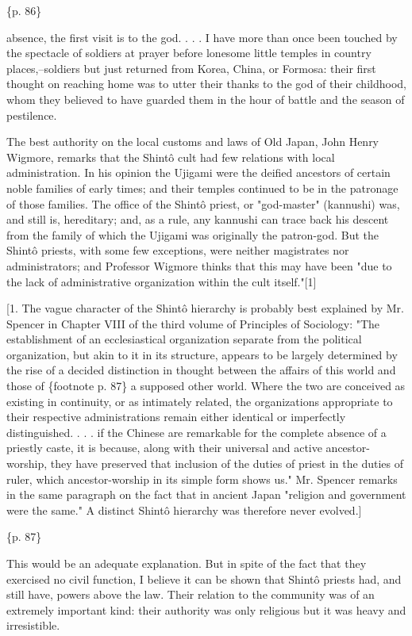\{p. 86\}

absence, the first visit is to the god. . . . I have more than once been touched by the spectacle of soldiers at prayer before lonesome little temples in country places,--soldiers but just returned from Korea, China, or Formosa: their first thought on reaching home was to utter their thanks to the god of their childhood, whom they believed to have guarded them in the hour of battle and the season of pestilence.



The best authority on the local customs and laws of Old Japan, John Henry Wigmore, remarks that the Shintô cult had few relations with local administration. In his opinion the Ujigami were the deified ancestors of certain noble families of early times; and their temples continued to be in the patronage of those families. The office of the Shintô priest, or "god-master" (kannushi) was, and still is, hereditary; and, as a rule, any kannushi can trace back his descent from the family of which the Ujigami was originally the patron-god. But the Shintô priests, with some few exceptions, were neither magistrates nor administrators; and Professor Wigmore thinks that this may have been "due to the lack of administrative organization within the cult itself."[1]

[1. The vague character of the Shintô hierarchy is probably best explained by Mr. Spencer in Chapter VIII of the third volume of Principles of Sociology: "The establishment of an ecclesiastical organization separate from the political organization, but akin to it in its structure, appears to be largely determined by the rise of a decided distinction in thought between the affairs of this world and those of \{footnote p. 87\} a supposed other world. Where the two are conceived as existing in continuity, or as intimately related, the organizations appropriate to their respective administrations remain either identical or imperfectly distinguished. . . . if the Chinese are remarkable for the complete absence of a priestly caste, it is because, along with their universal and active ancestor-worship, they have preserved that inclusion of the duties of priest in the duties of ruler, which ancestor-worship in its simple form shows us." Mr. Spencer remarks in the same paragraph on the fact that in ancient Japan "religion and government were the same." A distinct Shintô hierarchy was therefore never evolved.]

\{p. 87\}

This would be an adequate explanation. But in spite of the fact that they exercised no civil function, I believe it can be shown that Shintô priests had, and still have, powers above the law. Their relation to the community was of an extremely important kind: their authority was only religious but it was heavy and irresistible.

